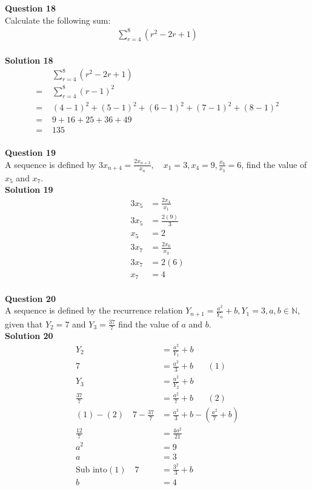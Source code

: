 \documentclass{article}
\begin{document}
\noindent\textbf{Question 18}\\[5pt]
Calculate the following sum:
\begin{align*}
\sum_{r=4}^{8} (r^2-2r+1)
\end{align*}\\[5pt]
\noindent\textbf{Solution 18}\\[5pt]
\begin{align*}
&\sum_{r=4}^{8} (r^2-2r+1)\\[2pt]
=\,\,&\sum_{r=4}^{8} (r-1)^2\\[2pt]
=\,\,&(4-1)^2+(5-1)^2+(6-1)^2+(7-1)^2+(8-1)^2\\[2pt]
=\,\,&9+16+25+36+49\\[2pt]
=\,\,&135
\end{align*}\\[10pt]

\noindent\textbf{Question 19}\\[5pt]
A sequence is defined by $3x_{n+4}=\displaystyle\frac{2x_{n+3}}{x_n}, \quad x_1=3,x_4=9, \displaystyle\frac{x_6}{x_3}=6$, find the value of $x_5$ and $x_7$.\\[5pt]
\noindent\textbf{Solution 19}\\[5pt]
\begin{align*}
3x_5&=\displaystyle\frac{2x_{4}}{x_1}\\[2pt]
3x_5&=\displaystyle\frac{2(9)}{3}\\[2pt]
x_5&=2\\[12pt]
3x_7&=\displaystyle\frac{2x_6}{x_3}\\[2pt]
3x_7&=2(6)\\[2pt]
x_7&=4
\end{align*}\\[10pt]

\noindent\textbf{Question 20}\\[5pt]
A sequence is defined by the recurrence relation $Y_{n+1}=\displaystyle\frac{a^2}{Y_n}+b, Y_1=3, a,b \in \mathbb{N}$, given that $Y_2=7$ and $Y_3=\displaystyle\frac{37}{7}$ find the value of $a$ and $b$.\\[5pt]
\noindent\textbf{Solution 20}\\[5pt]
\begin{align*}
Y_2&=\displaystyle\frac{a^2}{Y_1}+b\\[2pt]
7&=\displaystyle\frac{a^2}{3}+b\hspace{20pt}(1)\\[12pt]
Y_3&=\displaystyle\frac{a^2}{Y_2}+b\\[2pt]
\displaystyle\frac{37}{7}&=\displaystyle\frac{a^2}{7}+b\hspace{20pt}(2)\\[2pt]
(1)-(2)\quad 7-\displaystyle\frac{37}{7}&=\frac{a^2}{3}+b-\left(\frac{a^2}{7}+b\right)\\[2pt]
\displaystyle\frac{12}{7}&=\displaystyle\frac{4a^2}{21}\\[2pt]
a^2&=9\\[2pt]
a&=3\\[12pt]
\text{Sub into} (1)\quad 7&=\displaystyle\frac{3^2}{3}+b\\[2pt]
b&=4
\end{align*}\\[10pt]
\end{document}
